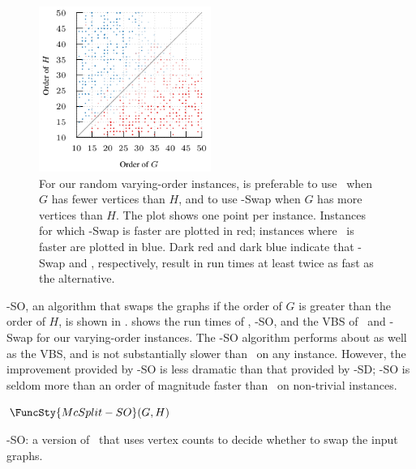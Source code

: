 \begin{figure}[h!]
    \centering
    \includegraphics*[width=0.5\textwidth]{14-mcsplit-i-undirected/modified-mcsplit-experiment/plots/plots/order-when-swap}
    \caption{For our random varying-order instances, is preferable to use \McSplit\ when $G$
        has fewer vertices than $H$, and to use \McSplit-Swap when $G$ has more vertices than $H$.
        The plot shows one point per instance.  Instances for which \McSplit-Swap
        is faster are plotted in red; instances where \McSplit\ is faster
        are plotted in blue.  Dark red and dark blue indicate that \McSplit-Swap and \McSplit,
        respectively, result in run times at least twice as fast as the alternative.}
    \label{figure:order-when-swap}
\end{figure}

\McSplit-SO, an algorithm that swaps the graphs if the order of $G$ is greater
than the order of $H$, is shown in .
 shows the run times of \McSplit,
\McSplit-SO, and the VBS of \McSplit\ and \McSplit-Swap for our varying-order
instances.  The \McSplit-SO
algorithm performs about as well as the VBS, and is not substantially slower
than \McSplit\ on any instance.  However, the improvement provided by
\McSplit-SO is less dramatic than that provided by \McSplit-SD; \McSplit-SO is
seldom more than an order of magnitude faster than \McSplit\ on non-trivial
instances.

\begin{algorithm}[h!]
\DontPrintSemicolon
\nl $\FuncSty{McSplit-SO}(G, H)$ \label{McSplitSOFun} \;
\nl {}
    \caption{\McSplit-SO: a version of \McSplit\ that uses vertex counts to decide whether to swap the input graphs.} 
\label{McSplitSOAlg}
\end{algorithm}

